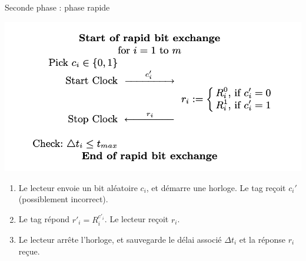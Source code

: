 \documentclass[aspectratio=169]{beamer}
\begin{document}
\begin{frame}{Seconde phase : phase rapide}
  \begin{multicols}{2}
    \begin{minipage}[c]{\linewidth}
      \centering
      \bigskip
      \includegraphics[width=\linewidth]{../assets/sk-phase2.png}
    \end{minipage}

    \begin{minipage}[t]{\linewidth}
      \begin{enumerate}
        \item Le lecteur envoie un bit aléatoire $c_i$, et démarre une horloge. Le tag reçoit $c_i'$ (possiblement incorrect).
        \item Le tag répond $r'_i = R_i^{c'_i}$. Le lecteur reçoit $r_i$.
        \item Le lecteur arrête l'horloge, et sauvegarde le délai associé $\Delta t_i$ et la réponse $r_i$ reçue.
      \end{enumerate}
    \end{minipage}
  \end{multicols}
\end{frame}
\end{document}
